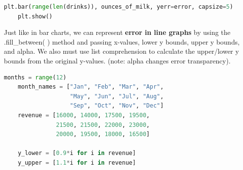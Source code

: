 \documentclass[11pt, a4paper]{article}
\begin{document}
\begin{spacing}{1.1}
\begin{lstlisting}[language=Python]
	plt.bar(range(len(drinks)), ounces_of_milk, yerr=error, capsize=5)
	plt.show() \end{lstlisting} \newpage
	\noindent Just like in bar charts, we can represent \textbf{error in line graphs} by using the .fill\_between( ) method and passing x-values, lower y bounds, upper y bounds, and alpha. We also must use list comprehension to calculate the upper/lower y bounds from the original y-values. (note: alpha changes error transparency).\\
	\begin{minipage}[c]{9.2cm}
	\begin{lstlisting}[language=Python]
	months = range(12)
	month_names = ["Jan", "Feb", "Mar", "Apr", 
	               "May", "Jun", "Jul", "Aug", 
	               "Sep", "Oct", "Nov", "Dec"]
	revenue = [16000, 14000, 17500, 19500, 
	           21500, 21500, 22000, 23000, 
	           20000, 19500, 18000, 16500]
	
	y_lower = [0.9*i for i in revenue]
	y_upper = [1.1*i for i in revenue]
	

\end{lstlisting}
\end{minipage}
\end{spacing}
\end{document}
